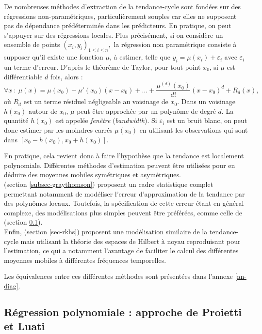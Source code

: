 \documentclass[
  12pt,
  a4paper,french]{article}
\newcommand\1{\mathds{1}}
\begin{document}
De nombreuses méthodes d'extraction de la tendance-cycle sont fondées sur des régressions non-paramétriques, particulièrement souples car elles ne supposent pas de dépendance prédéterminée dans les prédicteurs. En pratique, on peut s'appuyer sur des régressions locales.
Plus précisément, si on considère un ensemble de points \((x_i,y_i)_{1\leq i\leq n},\) la régression non paramétrique consiste à supposer qu'il existe une fonction \(\mu\), à estimer, telle que \(y_i=\mu(x_i)+\varepsilon_i\) avec \(\varepsilon_i\) un terme d'erreur.
D'après le théorème de Taylor, pour tout point \(x_0\), si \(\mu\) est différentiable \(d\) fois, alors :
\begin{equation}
\forall x \::\:\mu(x) = \mu(x_0) + \mu'(x_0)(x-x_0)+\dots +
\frac{\mu^{(d)}(x_0)}{d!}(x-x_0)^d+R_d(x), \label{eq:taylor}
\end{equation}
où \(R_d\) est un terme résiduel négligeable au voisinage de \(x_0\).
Dans un voisinage \(h(x_0)\) autour de \(x_0\), \(\mu\) peut être approchée par un polynôme de degré \(d\).
La quantité \(h(x_0)\) est appelée \emph{fenêtre} (\emph{bandwidth}).
Si \(\varepsilon_i\) est un bruit blanc, on peut donc estimer par les moindres carrés \(\mu(x_0)\) en utilisant les observations qui sont dans \(\left[x_0-h(x_0),x_0+h(x_0)\right]\).

En pratique, cela revient donc à faire l'hypothèse que la tendance est localement polynomiale. Différentes méthodes d'estimation peuvent être utilisées pour en déduire des moyennes mobiles symétriques et asymétriques.\\
\textcite{GrayThomson1996} (section \ref{subsec-graythomson}) proposent un cadre statistique complet permettant notamment de modéliser l'erreur d'approximation de la tendance par des polynômes locaux.
Toutefois, la spécification de cette erreur étant en général complexe, des modélisations plus simples peuvent être préférées, comme celle de \textcite{proietti2008} (section \ref{sec-proietti}).\\
Enfin, \textcite{dagumbianconcini2008} (section \ref{sec-rkhs}) proposent une modélisation similaire de la tendance-cycle mais utilisant la théorie des espaces de Hilbert à noyau reproduisant pour l'estimation, ce qui a notamment l'avantage de faciliter le calcul des différentes moyennes mobiles à différentes fréquences temporelles.

Les équivalences entre ces différentes méthodes sont présentées dans l'annexe \ref{an-diag}.

\hypertarget{sec-proietti}{%
\subsection{Régression polynomiale : approche de Proietti et Luati}\label{sec-proietti}}
\end{document}

